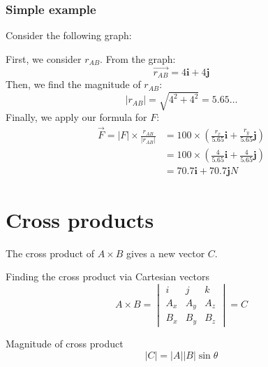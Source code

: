 \documentclass{article}
\begin{document}
\subsubsection{Simple example}
\begin{center}
  Consider the following graph:
  
  \begin{figure}[!ht]
    \centering
    \label{fig:my_label}
  \end{figure}
  
  First, we consider $r_{AB}$. From the graph:
  \[\vec{r_{AB}}=4\boldsymbol{i}+4\boldsymbol{j}\]
  Then, we find the magnitude of $r_{AB}$:
  \[|r_{AB}|=\sqrt{4^2+4^2}=5.65\dots\]
  Finally, we apply our formula for $F$:
  \begin{align*}
    \vec{F}=|F|\times\frac{r_{AB}}{|r_{AB}|}&=100\times(\frac{r_x}{5.65}\boldsymbol{i}+\frac{r_y}{5.65}\boldsymbol{j})\\&=100\times(\frac{4}{5.65}\boldsymbol{i}+\frac{4}{5.65}\boldsymbol{j})\\&=70.7\boldsymbol{i}+70.7\boldsymbol{j}N
  \end{align*}
\end{center}

\section{Cross products}
The cross product of $A\times B$ gives a new vector $C$.
\begin{definition}
  {Finding the cross product via Cartesian vectors}
  \[A\times B=\begin{vmatrix}
    i&j&k\\
    A_x&A_y&A_z\\
    B_x&B_y&B_z
  \end{vmatrix}=C\]
\end{definition}
\begin{definition}
  {Magnitude of cross product}
  \[|C|=|A||B|\sin\theta\]
\end{definition}
\end{document}
